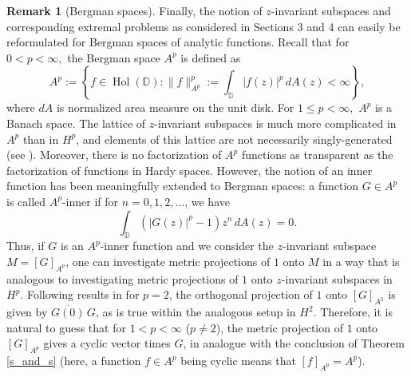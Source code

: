 \documentclass{article}
\theoremstyle{plain}
\numberwithin{Theorem}{section}
\numberwithin{equation}{section}
\theoremstyle{plain}
\theoremstyle{definition}
\newtheorem{Remark}[Theorem]{Remark}
\renewcommand{\leq}{\leqslant}
\newcommand{\D}{\mathbb{D}}
\newcommand{\T}{\mathbb{T}}
\begin{document}
\begin{Remark}[Bergman spaces]
Finally, the notion of $z$-invariant subspaces and corresponding extremal problems as considered in Sections 3 and 4 can easily be reformulated for Bergman spaces of analytic functions.  Recall that for $ 0 < p < \infty,$ the Bergman space $A^p$ is defined as
\begin{equation*}
    A^p := \left\{ f\in \operatorname{Hol}(\D) : 
    \|f\|_{A^p}^p := \int_{\D} |f(z)|^p\, dA(z) < \infty \right\},
\end{equation*}
where $dA$ is normalized area measure on the unit disk. For $1 \leq p < \infty,$ $A^p$ is a Banach space. The lattice of $z$-invariant subspaces is much more complicated in $A^p$ than in $H^p$, and elements of this lattice are not necessarily singly-generated (see \cite{MR808268, MR1241125}). Moreover, there is no factorization of $A^p$ functions as transparent as the factorization of functions in Hardy spaces. However, the notion of an inner function has been meaningfully extended to Bergman spaces: a function $G \in A^p$ is called $A^p$-inner if for $n = 0, 1, 2, \ldots$, we have 
\begin{equation*}
    \int_{\D} \left(|G(z)|^{p} -1 \right) z^ n \, dA(z) = 0.
\end{equation*}
Thus, if $G$ is an $A^p$-inner function and we consider the $z$-invariant subspace $M = [G]_{A^p}$, one can investigate metric projections of $1$ onto $M$ in a way that is analogous to investigating metric projections of $1$ onto $z$-invariant subspaces in $H^p$. Following results in \cite{MR1133317} for $p = 2$, the orthogonal projection of $1$ onto $[G]_{A^2}$ is given by $\overline{G(0)}\, G$, as is true within the analogous setup in $H^2$. Therefore, it is natural to guess that for $1 < p < \infty$ ($p \neq 2$), the metric projection of $1$ onto $[G]_{A^p}$ gives a cyclic vector times $G$, in analogue with the conclusion of Theorem \ref{s_and_s} (here, a function $f\in A^p$ being cyclic means that $[f]_{A^p} = A^p$). 
\end{Remark}

\end{document}
